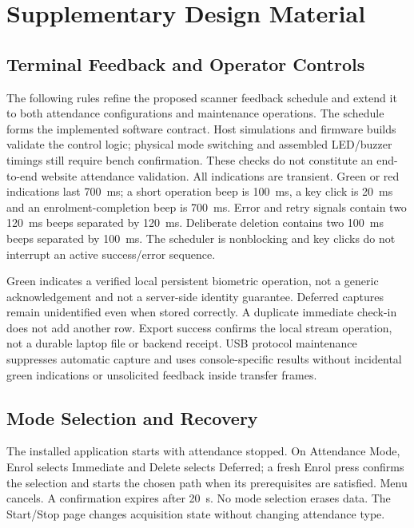 \chapter{Supplementary Design Material}\label{app:design}
\section{Terminal Feedback and Operator Controls}

The following rules refine the proposed scanner feedback schedule and extend it
to both attendance configurations and maintenance operations. The schedule
forms the implemented software contract. Host simulations and firmware builds
validate the control logic; physical mode switching and assembled LED/buzzer
timings still require bench confirmation. These checks do not constitute an
end-to-end website attendance validation. All indications
are transient. Green or red indications last 700~ms; a short operation beep is
100~ms, a key click is 20~ms and an enrolment-completion beep is 700~ms. Error and
retry signals contain two 120~ms beeps separated by 120~ms. Deliberate deletion
contains two 100~ms beeps separated by 100~ms. The scheduler is nonblocking and
key clicks do not interrupt an active success/error sequence.



Green indicates a verified local persistent biometric operation, not a generic
acknowledgement and not a server-side identity guarantee. Deferred captures
remain unidentified even when stored correctly. A duplicate immediate check-in
does not add another row. Export success confirms the local stream operation,
not a durable laptop file or backend receipt. USB protocol maintenance suppresses
automatic capture and uses console-specific results without incidental green
indications or unsolicited feedback inside transfer frames.

\section{Mode Selection and Recovery}

The installed application starts with attendance stopped. On Attendance Mode,
Enrol selects Immediate and Delete selects Deferred; a fresh Enrol press confirms
the selection and starts the chosen path when its prerequisites are satisfied.
Menu cancels. A confirmation expires after 20~s. No mode selection erases data.
The Start/Stop page changes acquisition state without changing attendance type.

